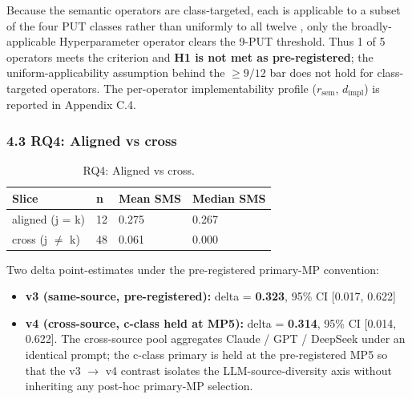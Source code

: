 \documentclass[review,12pt,authoryear]{elsarticle}
\providecommand{\tightlist}{\setlength{\itemsep}{0pt}\setlength{\parskip}{0pt}}
\begin{document}
Because the semantic operators are class-targeted, each is applicable
to a subset of the four PUT classes rather than uniformly to all twelve
, only the broadly-applicable Hyperparameter operator clears the
9-PUT threshold. Thus 1 of 5 operators meets the criterion and
\textbf{H1 is not met as pre-registered}; the uniform-applicability
assumption behind the $\geq 9/12$ bar does not hold for class-targeted
operators. The per-operator implementability profile ($r_{\mathrm{sem}}$,
$d_{\mathrm{impl}}$) is reported in Appendix C.4.

\subsubsection{4.3 RQ4: Aligned vs cross}\label{rq2-aligned-vs-cross-cliffs-delta}

{\def\LTcaptype{table} %
\begin{longtable}[]{@{}llll@{}}
\caption{RQ4: Aligned vs cross.}\label{tab:p2-09}\\
\toprule\noalign{}
Slice & n & Mean SMS & Median SMS \\
\midrule\noalign{}
\endhead
\bottomrule\noalign{}
\endlastfoot
aligned (j = k) & 12 & 0.275 & 0.267 \\
cross (j $\neq$ k) & 48 & 0.061 & 0.000 \\
\end{longtable}
}

Two delta point-estimates under the pre-registered primary-MP
convention:

\begin{itemize}
\tightlist
\item
  \textbf{v3 (same-source, pre-registered):} delta = \textbf{0.323},
  95\% CI {[}0.017, 0.622{]}
\item
  \textbf{v4 (cross-source, c-class held at MP5):} delta =
  \textbf{0.314}, 95\% CI {[}0.014, 0.622{]}. The cross-source pool
  aggregates Claude / GPT / DeepSeek under an identical prompt; the
  c-class primary is held at the pre-registered MP5 so that the v3 $\to$ v4
  contrast isolates the LLM-source-diversity axis without inheriting any
  post-hoc primary-MP selection.
\end{itemize}
\end{document}
